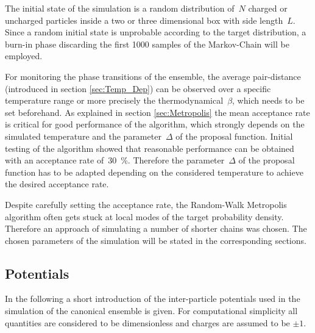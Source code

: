 \documentclass[11pt, a4paper]{article}
\numberwithin{equation}{section}
\begin{document}
The initial state of the simulation is a random distribution of~$N$ charged or uncharged particles inside a two or three dimensional box with side length~$L$.
Since a random initial state is unprobable according to the target distribution, a burn-in phase discarding the first 1000 samples of the Markov-Chain will be employed.

For monitoring the phase transitions of the ensemble, the average pair-distance (introduced in section \ref{sec:Temp_Dep}) can be observed over a specific temperature range or more precisely the thermodynamical~$\beta$, which needs to be set beforehand.
As explained in section \ref{sec:Metropolis} the mean acceptance rate is critical for good performance of the algorithm, which strongly depends on the simulated temperature and the parameter~$\Delta$ of the proposal function.
Initial testing of the algorithm showed that reasonable performance can be obtained with an acceptance rate of~\SI{30}{\percent}.
Therefore the parameter~$\Delta$ of the proposal function has to be adapted depending on the considered temperature to achieve the desired acceptance rate.

Despite carefully setting the acceptance rate, the Random-Walk Metropolis algorithm often gets stuck at local modes of the target probability density.
Therefore an approach of simulating a number of shorter chains was chosen.
The chosen parameters of the simulation will be stated in the corresponding sections.

\subsection{Potentials} \label{sec:Potentials}
In the following a short introduction of the inter-particle potentials used in the simulation of the canonical ensemble is given.
For computational simplicity all quantities are considered to be dimensionless and charges are assumed to be $\pm 1$.
\end{document}
